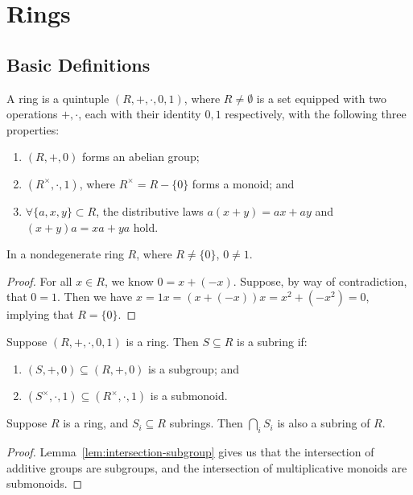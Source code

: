 \chapter{Rings}\label{sec:rings}

\section{Basic Definitions}

\begin{definition}
    A ring is a quintuple \((R,+,\cdot,0,1)\),
    where \(R \neq \emptyset\) is a set
    equipped with two operations \(+,\cdot\),
    each with their identity \(0,1\) respectively,
    with the following three properties:
    \begin{enumerate}[label={(\roman*)}, itemsep=0mm]
        \item \((R,+,0)\) forms an abelian group;
        \item \((R^\times,\cdot,1)\),
            where \(R^\times = R - \{0\}\) forms a monoid; and
        \item \(\forall \{a,x,y\} \subset R\),
            the distributive laws \(a(x+y) = ax + ay\)
            and \((x+y)a = xa + ya\) hold.
    \end{enumerate}
\end{definition}
\begin{proposition}
    In a nondegenerate ring \(R\), where \(R \neq \{0\}\), \(0 \neq 1\).
\end{proposition}
\begin{proof}
    For all \(x \in R\), we know \(0 = x + (-x)\).
    Suppose, by way of contradiction, that \(0 = 1\).
    Then we have \(x = 1x = (x+(-x))x = x^2 + (-x^2) = 0\),
    implying that \(R = \{0\}\).
\end{proof}

\begin{definition}
    Suppose \((R,+,\cdot,0,1)\) is a ring.
    Then \(S \subseteq R\) is a subring if:
    \begin{enumerate}[label={(\roman*)}, itemsep=0mm]
        \item \((S,+,0) \subseteq (R,+,0)\) is a subgroup; and
        \item \((S^\times,\cdot,1) \subseteq (R^\times,\cdot,1)\) is a submonoid.
    \end{enumerate}
\end{definition}

\begin{lemma}\label{lem:intersection-subring}
    Suppose \(R\) is a ring, and \(S_i \subseteq R\) subrings.
    Then \(\bigcap_i S_i\) is also a subring of \(R\).
\end{lemma}
\begin{proof}
    Lemma~\ref{lem:intersection-subgroup} gives us that
    the intersection of additive groups are subgroups,
    and the intersection of multiplicative monoids are submonoids.
\end{proof}

